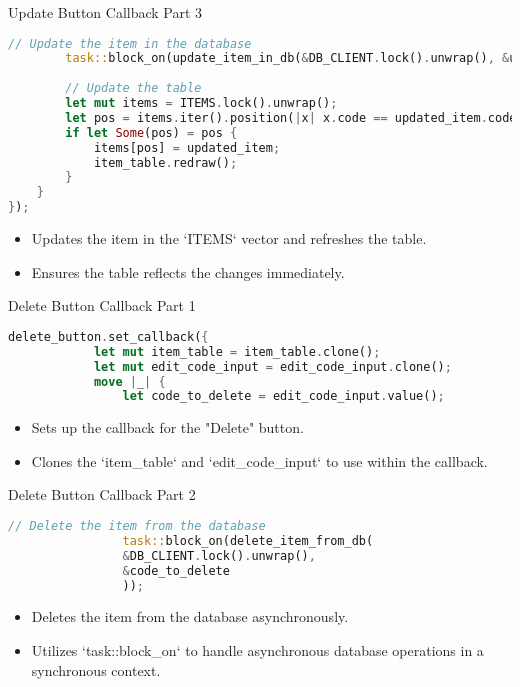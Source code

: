 \documentclass[aspectratio=169, table]{beamer}
\begin{document}
\begin{frame}[fragile]{Update Button Callback Part 3}
\vspace{15pt}
\begin{lstlisting}[language=Rust]
		// Update the item in the database
		task::block_on(update_item_in_db(&DB_CLIENT.lock().unwrap(), &updated_item));
		
		// Update the table
		let mut items = ITEMS.lock().unwrap();
		let pos = items.iter().position(|x| x.code == updated_item.code);
		if let Some(pos) = pos {
			items[pos] = updated_item;
			item_table.redraw();
		}
	}
});
\end{lstlisting}
\begin{itemize}
\item Updates the item in the `ITEMS` vector and refreshes the table.
\item Ensures the table reflects the changes immediately.
\end{itemize}
\end{frame}

	


\begin{frame}[fragile]{Delete Button Callback Part 1}
	\begin{lstlisting}[language=Rust]
		delete_button.set_callback({
			let mut item_table = item_table.clone();
			let mut edit_code_input = edit_code_input.clone();
			move |_| {
				let code_to_delete = edit_code_input.value();
			\end{lstlisting}
			
			\begin{itemize}
				\item Sets up the callback for the "Delete" button.
				\item Clones the `item\_table` and `edit\_code\_input` to use within the callback.
			\end{itemize}
		\end{frame}
		
		\begin{frame}[fragile]{Delete Button Callback Part 2}
			\begin{lstlisting}[language=Rust]
				// Delete the item from the database
				task::block_on(delete_item_from_db(
				&DB_CLIENT.lock().unwrap(),
				&code_to_delete
				));
			\end{lstlisting}
			
			\begin{itemize}
				\item Deletes the item from the database asynchronously.
				\item Utilizes `task::block\_on` to handle asynchronous database operations in a synchronous context.
			\end{itemize}
		\end{frame}
		
\end{document}

